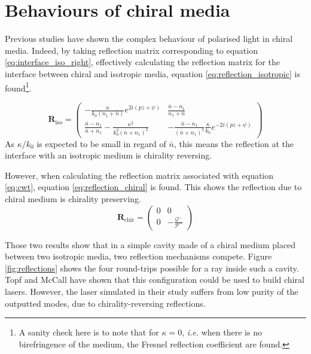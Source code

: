 \section{Behaviours of chiral media}

Previous studies\cite{mccall_simplified_2009} have shown the complex behaviour of polarised light in chiral media. Indeed, by taking reflection matrix corresponding to equation \ref{eq:interface_iso_right}, effectively calculating the reflection matrix for the interface between chiral and isotropic media, equation \ref{eq:reflection_isotropic} is found\footnote{A sanity check here is to note that for $\kappa=0$, \textit{i.e.} when there is no birefringence of the medium, the Fresnel reflection coefficient are found.}.

\begin{equation}
	\bm{R}_{\text{iso}} = \begin{pmatrix}
	-\frac{\kappa}{k_0(n_1+\bar{n})}e^{2i(pz+\psi)} & \frac{\bar{n}-n_1}{n_1+\bar{n}}\\
	\frac{\bar{n}-n_1}{\bar{n}+n_1}-\frac{\kappa^2}{k_0^2(\bar{n}+n_1)^2} & -\frac{\bar{n}-n_1}{(\bar{n}+n_1)^2}\frac{\kappa}{k_0}e^{-2i(pz+\psi)}
	\end{pmatrix}\label{eq:reflection_isotropic}
\end{equation}
%
As $\kappa/k_0$ is expected to be small in regard of $\bar{n}$, this means the reflection at the interface with an isotropic medium is chirality reversing.

However, when calculating the reflection matrix associated with equation \ref{eq:cwt}, equation \ref{eq:reflection_chiral} is found. This shows the reflection due to chiral medium is chirality preserving.
\begin{equation}
\bm{R}_{\text{chir}} = \begin{pmatrix}
	0 & 0\\0 & -\frac{\mathcal{Q}^-}{\mathcal{P}^-}
\end{pmatrix} \label{eq:reflection_chiral}
\end{equation}

Those two results show that in a simple cavity made of a chiral medium placed between two isotropic media, two reflection mechanisms compete. Figure \ref{fig:reflections} shows the four round-trips possible for a ray inside such a cavity. Topf and McCall have shown that this configuration could be used to build chiral lasers\cite{topf_modes_2014}. However, the laser simulated in their study suffers from low purity of the outputted modes, due to chirality-reversing reflections.

